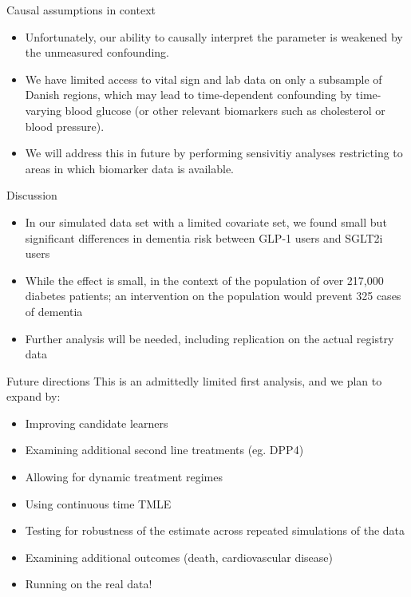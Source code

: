 \documentclass[
  ignorenonframetext,
  twocolumn]{beamer}
\providecommand{\tightlist}{%
  \setlength{\itemsep}{0pt}\setlength{\parskip}{0pt}}
\renewcommand{\tightlist}{\setlength{\itemsep}{2ex}\setlength{\parskip}{0pt}}
\begin{document}
\begin{frame}{Causal assumptions in context}
\protect\hypertarget{causal-assumptions-in-context}{}
\begin{itemize}
\tightlist
\item
  Unfortunately, our ability to causally interpret the parameter is
  weakened by the unmeasured confounding.
\item
  We have limited access to vital sign and lab data on only a subsample
  of Danish regions, which may lead to time-dependent confounding by
  time-varying blood glucose (or other relevant biomarkers such as
  cholesterol or blood pressure).
\item
  We will address this in future by performing sensivitiy analyses
  restricting to areas in which biomarker data is available.
\end{itemize}
\end{frame}

\begin{frame}{Discussion}
\protect\hypertarget{discussion}{}
\begin{itemize}
\tightlist
\item
  In our simulated data set with a limited covariate set, we found small
  but significant differences in dementia risk between GLP-1 users and
  SGLT2i users
\item
  While the effect is small, in the context of the population of over
  217,000 diabetes patients; an intervention on the population would
  prevent 325 cases of dementia
\item
  Further analysis will be needed, including replication on the actual
  registry data
\end{itemize}
\end{frame}

\begin{frame}{Future directions}
\protect\hypertarget{future-directions}{}
This is an admittedly limited first analysis, and we plan to expand by:

\begin{itemize}
\tightlist
\item
  Improving candidate learners
\item
  Examining additional second line treatments (eg. DPP4)
\item
  Allowing for dynamic treatment regimes
\item
  Using continuous time TMLE
\item
  Testing for robustness of the estimate across repeated simulations of
  the data
\item
  Examining additional outcomes (death, cardiovascular disease)
\item
  Running on the real data!
\end{itemize}
\end{frame}
\end{document}

